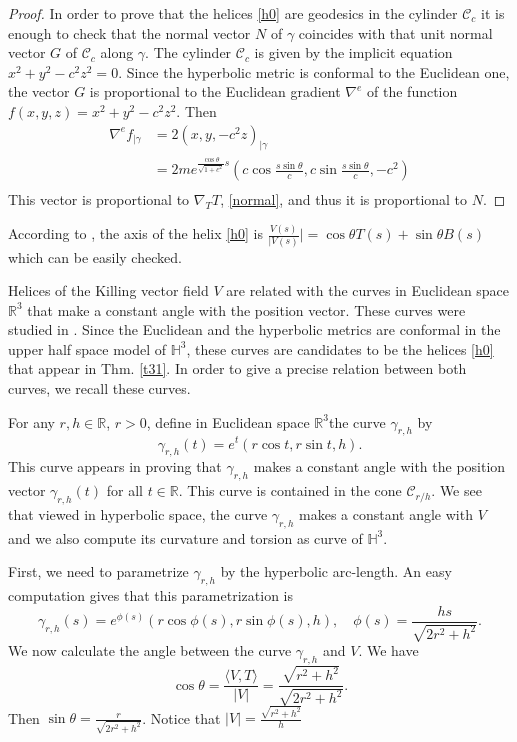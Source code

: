 \documentclass[a4paper,12pt]{amsart}
\theoremstyle{definition}
\def\r{\mathbb R}
\def\h{\mathbb H}
\begin{document}
\begin{proof}
In order to prove that the helices \eqref{h0} are geodesics  in the cylinder $\mathcal{C}_c$ it is enough to check that the normal vector $N$ of $\gamma$ coincides with that unit normal vector $G$ of $\mathcal{C}_c$ along $\gamma$. The cylinder $\mathcal{C}_c$ is given by the implicit equation $x^2+y^2-c^2z^2=0$. Since the hyperbolic metric is conformal to the Euclidean one, the vector $G$ is proportional to the Euclidean gradient $\nabla^e$ of the function $f(x,y,z)= x^2+y^2-c^2z^2$. Then 
\begin{equation*}
\begin{split}
\nabla^ef_{|\gamma}&=2(x,y,-c^2 z)_{|\gamma}\\
&=2me^{\frac{\cos\theta}{\sqrt{1+c^2}}s}\left(c \cos\frac{s\sin\theta}{c},c \sin \frac{s\sin\theta}{c}, -c^2\right)\\
\end{split}
\end{equation*}
This vector is proportional to $\nabla_TT$, \eqref{normal}, and thus it is proportional to $N$.
  \end{proof}
According to \cite{ba}, the axis of the helix \eqref{h0} is $\frac{V(s)}{|V(s)}|=\cos\theta T(s)+\sin\theta B(s)$ which can be easily checked.
 
 
 Helices of the Killing vector field $V$ are related with the curves in Euclidean space $\r^3$ that make a constant angle with the position vector. These curves were studied in \cite{bo}. Since the Euclidean and the hyperbolic metrics are conformal in the upper half space model of $\h^3$, these curves are candidates to be the helices \eqref{h0} that appear in Thm. \ref{t31}. In order to give a precise relation between both curves, we recall these curves. 
  
 For any $r,h\in\r$, $r>0$, define in Euclidean space $\r^3$the curve $\gamma_{r,h}$ by 
 $$\gamma_{r,h}(t)=e^t(r\cos t,r\sin t, h).$$
 This curve appears in \cite[p. 28]{bo} proving that $\gamma_{r,h}$ makes a constant angle with the position vector $\gamma_{r,h}(t)$ for all $t\in \r$. This curve is contained in the cone $\mathcal{C}_{r/h}$. We   see that viewed in hyperbolic space, the curve $\gamma_{r,h}$ makes a constant angle with $V$ and we also compute its curvature and torsion as curve of $\h^3$.  
 
 First, we need to parametrize $\gamma_{r,h}$ by the hyperbolic arc-length. An easy computation gives that this parametrization is  
 \begin{equation}\label{h1}
 \gamma_{r,h}(s)=e^{\phi(s)}(r\cos\phi(s),r\sin\phi(s),h),\quad \phi(s)=\frac{hs}{\sqrt{2r^2+h^2}}.
 \end{equation}
 We now calculate the angle between the curve $\gamma_{r,h}$ and $V$. We have 
  $$
  \cos\theta=\frac{\langle V,T\rangle}{|V|}=\frac{\sqrt{r^2+h^2}}{\sqrt{2r^2+h^2}}.$$
  Then $\sin\theta=\frac{r}{\sqrt{2r^2+h^2}}$. Notice that $|V|=\frac{\sqrt{r^2+h^2}}{h}$
  
\end{document}
